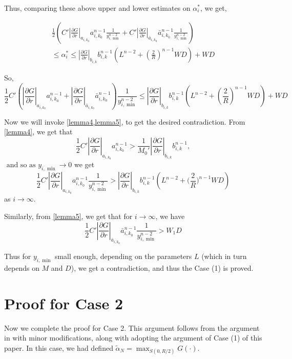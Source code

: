 \documentclass{article}
\newcounter{lem}
\theoremstyle{plain}
\theoremstyle{definition}
\theoremstyle{plain}
\begin{document}
Thus, comparing these above upper and lower estimates on $\alpha^{*}_i$, we get,

\begin{multline}
\frac{1}{2} \left( C' \left| \frac{\partial G}{\partial r} \right|_{a_{i,k_0}} a_{i,k_0}^{n-1} \frac{1}{y_{i, \min}^{n-2}} + C' \left| \frac{\partial G}{\partial r} \right|_{\bar{a}_{i,k_0}} \bar{a}_{i,k_0}^{n-1} \frac{1}{y_{i, \min}^{n-2}} \right)  \\ \le \alpha_{i}^{*} \le \left| \frac{\partial G}{\partial r} \right|_{b_{i,k}} b_{i,k}^{n-1} \left( L^{n-2} + \left( \frac{2}{R} \right)^{n-1} WD \right) + WD
\end{multline}

So, 
\begin{equation*}
\frac{1}{2} C' \left( \left| \frac{\partial G}{\partial r} \right|_{a_{i,k_0}} a_{i,k_0}^{n-1} + \left| \frac{\partial G}{\partial r} \right|_{\bar{a}_{i,k_0}} \bar{a}_{i,k_0}^{n-1} \right) \frac{1}{y_{i, \min}^{n-2}} \le \left| \frac{\partial G}{\partial r} \right|_{b_{i,k}} b_{i,k}^{n-1} \left( L^{n-2} + \left( \frac{2}{R} \right)^{n-1} WD \right) + WD
\end{equation*}

Now we will invoke \cref{lemma4,lemma5}, to get the desired contradiction. From \cref{lemma4}, we get that
\begin{equation*}
\frac{1}{2} C' \left| \frac{\partial G}{\partial r} \right|_{a_{i,k_0}} a_{i,k_0}^{n-1} > \frac{1}{M_0'} \left| \frac{\partial G}{\partial r} \right|_{b_{i,k}} b_{i,k}^{n-1}, 
\end{equation*}
 $\text{ and so as } y_{i, \min} \to 0$ we get $$\frac{1}{2} C' \left| \frac{\partial G}{\partial r} \right|_{a_{i,k_0}} a_{i,k_0}^{n-1} \frac{1}{y_{i, \min}^{n-2}} > \left| \frac{\partial G}{\partial r} \right|_{b_{i,k}} b_{i,k}^{n-1} \left( L^{n-2} + \Big(\frac{2}{R}\Big)^{n-1} WD \right)$$ as $i \to \infty$.

Similarly, from \cref{lemma5}, we get that for $i \to \infty$, we have
\begin{equation*}
\frac{1}{2} C' \left| \frac{\partial G}{\partial r} \right|_{\bar{a}_{i,k_0}} \bar{a}_{i,k_0}^{n-1} \frac{1}{y_{i, \min}^{n-2}} > W_1 D
\end{equation*}

Thus for $y_{i, \min}$ small enough, depending on the parameters $L$ (which in turn depends on $M$ and $D$), we get a contradiction, and thus the Case (1) is proved.

\section{Proof for Case 2}
Now we complete the proof for Case 2.
This argument follows from the argument in \cite{Pat25} with minor modifications, along with adopting the argument of Case (1) of this paper. In this case, we had defined $\tilde{\alpha}_N = \max_{S(0, R/2)} G(\cdot)$.
\end{document}

